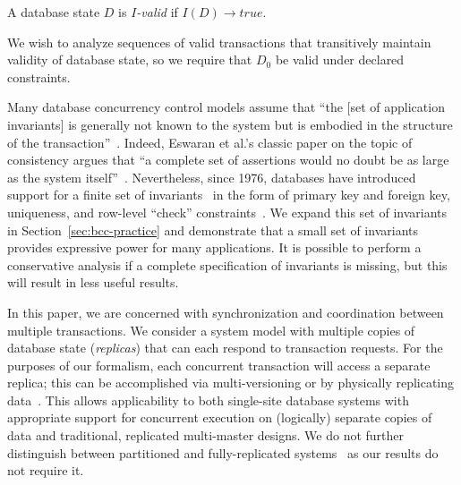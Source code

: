 \begin{definition}
A database state $D$ is \textit{$I$-valid} if $I(D) \rightarrow true$.
\end{definition}

We wish to analyze sequences of valid transactions that transitively
maintain validity of database state, so we require that $D_0$ be valid
under declared constraints.

 Many database concurrency
control models assume that ``the [set of application invariants] is
generally not known to the system but is embodied in the structure of
the transaction''~\cite{traiger-tods}. Indeed, Eswaran et al.'s
classic paper on the topic of consistency argues that ``a complete set
of assertions would no doubt be as large as the system
itself''~\cite{eswaran-consistency}. Nevertheless, since 1976,
databases have introduced support for a finite set of
invariants~\cite{korth-serializability,decomp-semantics,garciamolina-semantics,ic-survey,ic-survey-two}
in the form of primary key and foreign key, uniqueness, and row-level
``check'' constraints~\cite{kemme-si-ic}. We expand this set of
invariants in Section~\ref{sec:bcc-practice} and demonstrate that a
small set of invariants provides expressive power for many
applications. It is possible to perform a conservative analysis if a
complete specification of invariants is missing, but this will result
in less useful results.\vspace{.5em}


 In this paper, we are concerned with
synchronization and coordination between multiple transactions. We
consider a system model with multiple copies of database state
(\textit{replicas}) that can each respond to transaction requests. For
the purposes of our formalism, each concurrent transaction will access
a separate replica; this can be accomplished via multi-versioning or
by physically replicating data~\cite{bernstein-book}. This allows
applicability to both single-site database systems with appropriate
support for concurrent execution on (logically) separate copies of
data and traditional, replicated multi-master designs. We do not
further distinguish between partitioned and fully-replicated
systems~\cite{hat-vldb} as our results do not require it.


